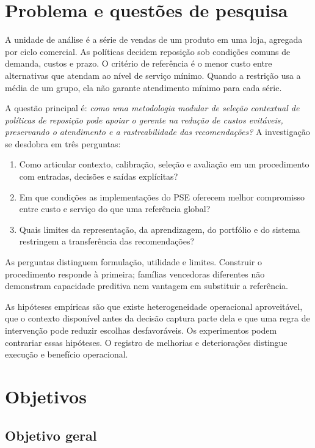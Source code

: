 

\section{Problema e questões de pesquisa}

A unidade de análise é a série de vendas de um produto em uma loja, agregada por ciclo comercial. As políticas decidem reposição sob condições comuns de demanda, custos e prazo. O critério de referência é o menor custo entre alternativas que atendam ao nível de serviço mínimo. Quando a restrição usa a média de um grupo, ela não garante atendimento mínimo para cada série.

A questão principal é: \emph{como uma metodologia modular de seleção contextual de políticas de reposição pode apoiar o gerente na redução de custos evitáveis, preservando o atendimento e a rastreabilidade das recomendações?} A investigação se desdobra em três perguntas:

\begin{enumerate}
  \item Como articular contexto, calibração, seleção e avaliação em um procedimento com entradas, decisões e saídas explícitas?
  \item Em que condições as implementações do PSE oferecem melhor compromisso entre custo e serviço do que uma referência global?
  \item Quais limites da representação, da aprendizagem, do portfólio e do sistema restringem a transferência das recomendações?
\end{enumerate}

As perguntas distinguem formulação, utilidade e limites. Construir o procedimento responde à primeira; famílias vencedoras diferentes não demonstram capacidade preditiva nem vantagem em substituir a referência.

As hipóteses empíricas são que existe heterogeneidade operacional aproveitável, que o contexto disponível antes da decisão captura parte dela e que uma regra de intervenção pode reduzir escolhas desfavoráveis. Os experimentos podem contrariar essas hipóteses. O registro de melhorias e deteriorações distingue execução e benefício operacional.

\section{Objetivos}

\subsection*{Objetivo geral}

